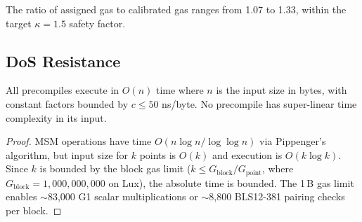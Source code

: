 The ratio of assigned gas to calibrated gas ranges from 1.07 to 1.33, within the target $\kappa = 1.5$ safety factor.

\subsection{DoS Resistance}

\begin{proposition}
All precompiles execute in $O(n)$ time where $n$ is the input size in bytes, with constant factors bounded by $c \leq 50$ ns/byte. No precompile has super-linear time complexity in its input.
\end{proposition}

\begin{proof}
MSM operations have time $O(n \log n / \log \log n)$ via Pippenger's algorithm, but input size for $k$ points is $O(k)$ and execution is $O(k \log k)$. Since $k$ is bounded by the block gas limit ($k \leq G_{\text{block}} / G_{\text{point}}$, where $G_{\text{block}} = 1{,}000{,}000{,}000$ on Lux), the absolute time is bounded. The 1\,B gas limit enables $\sim$83{,}000 G1 scalar multiplications or $\sim$8{,}800 BLS12-381 pairing checks per block.
\end{proof}

